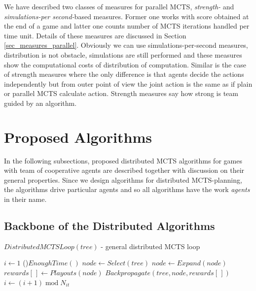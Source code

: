 We have described two classes of measures for parallel MCTS, \emph{strength-} and
\emph{simulations-per second-}based measures. Former one works with score obtained at the end
of a game and latter one counts number of MCTS iterations handled per time unit. Details of
these measures are discussed in Section \ref{sec_measures_parallel}. Obviously we can use
simulations-per-second measures, distribution is not obstacle, simulations are still performed
and these measures show the computational costs of distribution of computation. Similar is the
case of strength measures where the only difference is that agents decide the actions
independently but from outer point of view the joint action is the same as if plain or parallel
MCTS calculate action. Strength measures say how strong is team guided by an algorithm.



\section{Proposed Algorithms}

In the following subsections, proposed distributed MCTS algorithms for games with team of cooperative agents
are described together with discussion on their general properties. Since we design algorithms
for distributed MCTS-planning, the algorithms drive particular agents and so all algorithms
have the work \emph{agents} in their name.

\subsection{Backbone of the Distributed Algorithms}
\label{sec_dmcts_common}

\begin{algorithm}
\DontPrintSemicolon
\caption{$DistributedMCTSLoop(tree)$ - general distributed MCTS loop\label{alg_dmcts_common}}
$i \leftarrow 1$\;
\While(){$EnoughTime()$}{
    $node \leftarrow Select(tree)$ \;
    $node \leftarrow Expand(node)$ \;
    $rewards[\,] \leftarrow Playouts(node)$ \;
    $Backpropagate(tree,node,rewards[\,])$ \;
    $i \leftarrow (i + 1)\;\mathrm{mod}\;N_{it}$\;
}
 \;
\end{algorithm}


